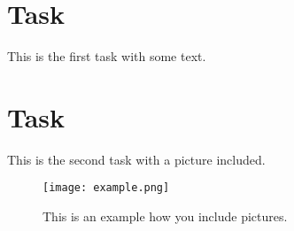 \documentclass{article} %
\begin{document}
\section{Task}
This is the first task with some text.
\lipsum[1-2]

\section{Task}
This is the second task with a picture included.
\lipsum[2-3]
\begin{figure}[h]
    \centering
    \texttt{[image: example.png]}
    \caption{This is an example how you include pictures.}
    \label{fig:example}
\end{figure}
\end{document}
